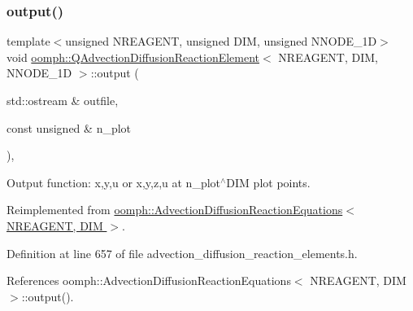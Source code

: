 \mbox{\label{classoomph_1_1QAdvectionDiffusionReactionElement_acafd4d0efa43a6c63600c8f1e8823c5b}} 
\subsubsection{\texorpdfstring{output()}{output()}\hspace{0.1cm}{\footnotesize\ttfamily [2/4]}}
{\footnotesize\ttfamily template$<$unsigned N\+R\+E\+A\+G\+E\+NT, unsigned D\+IM, unsigned N\+N\+O\+D\+E\+\_\+1D$>$ \\
void \hyperlink{classoomph_1_1QAdvectionDiffusionReactionElement}{oomph\+::\+Q\+Advection\+Diffusion\+Reaction\+Element}$<$ N\+R\+E\+A\+G\+E\+NT, D\+IM, N\+N\+O\+D\+E\+\_\+1D $>$\+::output (\begin{DoxyParamCaption}\item[{std\+::ostream \&}]{outfile,  }\item[{const unsigned \&}]{n\+\_\+plot }\end{DoxyParamCaption})\hspace{0.3cm}{\ttfamily [inline]}, {\ttfamily [virtual]}}



Output function\+: x,y,u or x,y,z,u at n\+\_\+plot$^\wedge$\+D\+IM plot points. 



Reimplemented from \hyperlink{classoomph_1_1AdvectionDiffusionReactionEquations_a38aa99ed50cc082f0c9c7079a13a11da}{oomph\+::\+Advection\+Diffusion\+Reaction\+Equations$<$ N\+R\+E\+A\+G\+E\+N\+T, D\+I\+M $>$}.



Definition at line 657 of file advection\+\_\+diffusion\+\_\+reaction\+\_\+elements.\+h.



References oomph\+::\+Advection\+Diffusion\+Reaction\+Equations$<$ N\+R\+E\+A\+G\+E\+N\+T, D\+I\+M $>$\+::output().

\mbox{\label{classoomph_1_1QAdvectionDiffusionReactionElement_a5a3333fcb25ba0d5e74e74c2964d8d1c}} 
